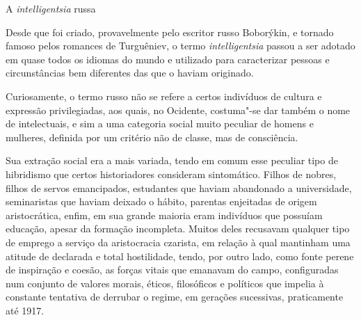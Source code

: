 \begin{center}
\large
A \emph{intelligentsia} russa
\end{center}

Desde que foi criado, provavelmente pelo escritor russo Boborýkin, e tornado
famoso pelos romances de Turguêniev, o termo \emph{intelligentsia}
passou a ser adotado em quase todos os idiomas do mundo e utilizado para
caracterizar pessoas e circunstâncias bem diferentes das que o haviam
originado.

Curiosamente, o termo russo não se refere a certos indivíduos de cultura
e expressão privilegiadas, aos quais, no Ocidente, costuma"-se dar também
o nome de intelectuais, e sim a uma categoria social muito peculiar de
homens e mulheres, definida por um critério não de classe, mas de
consciência.

Sua extração social era a mais variada, tendo em comum esse peculiar
tipo de hibridismo que certos historiadores consideram sintomático.
Filhos de nobres, filhos de servos emancipados, estudantes que haviam
abandonado a universidade, seminaristas que haviam deixado o hábito,
parentas enjeitadas de origem aristocrática, enfim, em sua grande maioria eram
indivíduos que possuíam educação, apesar da formação incompleta.
Muitos deles recusavam qualquer tipo de emprego a serviço da
aristocracia czarista, em relação à qual mantinham uma atitude de
declarada e total hostilidade, tendo, por outro lado, como fonte perene
de inspiração e coesão, as forças vitais que emanavam do campo,
configuradas num conjunto de valores morais, éticos, filosóficos e
políticos que impelia à constante tentativa de derrubar o regime, em
gerações sucessivas, praticamente até 1917.

